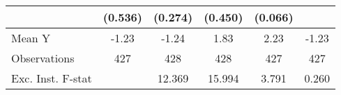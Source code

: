 {\begin{tabular}{l*{5}{c}}
            &     (0.536)         &     (0.274)         &     (0.450)         &     (0.066)         &                     \\
\midrule
Mean Y      &       -1.23         &       -1.24         &        1.83         &        2.23         &       -1.23         \\
Observations&         427         &         428         &         428         &         427         &         427         \\
Exc. Inst. F-stat&                     &      12.369         &      15.994         &       3.791         &       0.260         \\
\bottomrule
\end{tabular}
}
